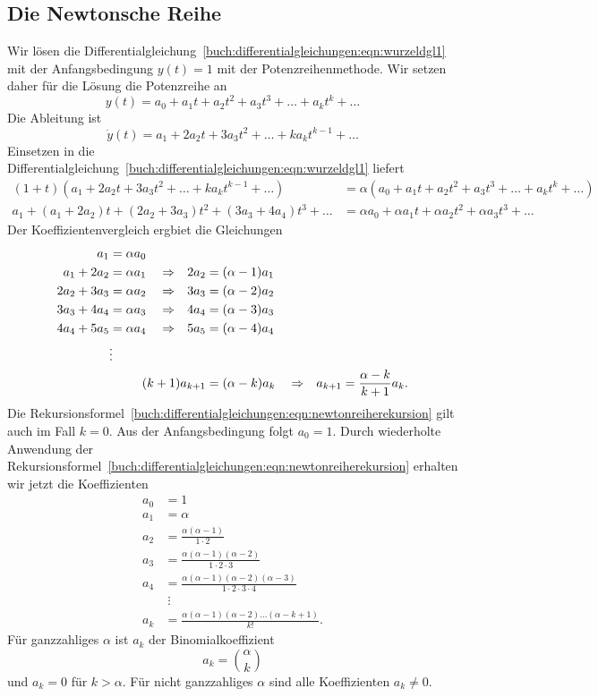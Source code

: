 \subsection{Die Newtonsche Reihe}
Wir lösen die
Differentialgleichung~\eqref{buch:differentialgleichungen:eqn:wurzeldgl1}
mit der Anfangsbedingung $y(t)=1$ mit der Potenzreihenmethode.
Wir setzen daher für die Lösung die Potenzreihe an
\[
y(t)
=
a_0 + a_1t + a_2t^2 + a_3t^3 + \dots + a_kt^k + \dots
\]
Die Ableitung ist
\[
\dot{y}(t)
=
a_1 + 2a_2t + 3a_3t^2 + \dots  + ka_kt^{k-1} + \dots
\]
Einsetzen in die 
Differentialgleichung~\eqref{buch:differentialgleichungen:eqn:wurzeldgl1}
liefert
\begin{align*}
(1+t)
(
a_1 + 2a_2t + 3a_3t^2 + \dots  + ka_kt^{k-1} + \dots
)
&=
\alpha
(
a_0 + a_1t + a_2t^2 + a_3t^3 + \dots + a_kt^k + \dots
)
\\
a_1
+(a_1+2a_2)t
+(2a_2+3a_3)t^2
+(3a_3+4a_4)t^3
+\dots
&=
\alpha a_0 + \alpha a_1t + \alpha a_2t^2 + \alpha a_3t^3 + \dots
\end{align*}
Der Koeffizientenvergleich ergbiet die Gleichungen
\begin{align}
a_1&=\alpha a_0
\notag
\\
a_1+2a_2 &= \alpha a_1 &&\Rightarrow& 2a_2 &= (\alpha-1) a_1
\notag
\\
2a_2+3a_3 &= \alpha a_2&&\Rightarrow& 3a_3 &= (\alpha-2) a_2
\notag
\\
3a_3+4a_4 &= \alpha a_3&&\Rightarrow& 4a_4 &= (\alpha-3) a_3
\notag
\\
4a_4+5a_5 &= \alpha a_4&&\Rightarrow& 5a_5 &= (\alpha-4) a_4
\notag
\\
&\vdots
\notag
\\
&&&& \llap{$(k+1)a_{k+1}$} &= (\alpha-k) a_k
&&\Rightarrow&
a_{k+1} = \frac{\alpha-k}{k+1}a_k.
\label{buch:differentialgleichungen:eqn:newtonreiherekursion}
\end{align}
Die
Rekursionsformel~\eqref{buch:differentialgleichungen:eqn:newtonreiherekursion}
gilt auch im Fall $k=0$.
Aus der Anfangsbedingung folgt $a_0=1$.
Durch wiederholte Anwendung der 
Rekursionsformel~\eqref{buch:differentialgleichungen:eqn:newtonreiherekursion}
erhalten wir jetzt die Koeffizienten
\begin{align*}
a_0&=1
\\
a_1&=\alpha
\\
a_2&=\frac{\alpha(\alpha-1)}{1\cdot 2}
\\
a_3&=\frac{\alpha(\alpha-1)(\alpha-2)}{1\cdot 2\cdot 3}
\\
a_4&=\frac{\alpha(\alpha-1)(\alpha-2)(\alpha-3)}{1\cdot 2\cdot 3\cdot 4}
\\
&\;\vdots
\\
a_k&=\frac{\alpha(\alpha-1)(\alpha-2)\dots(\alpha-k+1)}{k!}.
\end{align*}
Für ganzzahliges $\alpha$ ist $a_k$ der Binomialkoeffizient
\[
a_k=\binom{\alpha}{k}
\]
und $a_k=0$ für $k>\alpha$.
Für nicht ganzzahliges $\alpha$ sind alle Koeffizienten $a_k\ne 0$.

